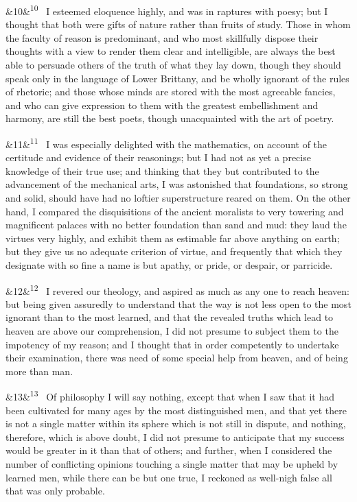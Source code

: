 \documentclass[12pt]{article}
\newcommand{\para}[1][]{\par\noindent\ifx&#1&\else\textsuperscript{\footnotesize #1}~\fi}
\begin{document}
\para[10] I esteemed eloquence highly, and was in raptures with poesy; but I thought that both were gifts of nature rather than fruits of study. Those in whom the faculty of reason is predominant, and who most skillfully dispose their thoughts with a view to render them clear and intelligible, are always the best able to persuade others of the truth of what they lay down, though they should speak only in the language of Lower Brittany, and be wholly ignorant of the rules of rhetoric; and those whose minds are stored with the most agreeable fancies, and who can give expression to them with the greatest embellishment and harmony, are still the best poets, though unacquainted with the art of poetry.

\para[11] I was especially delighted with the mathematics, on account of the certitude and evidence of their reasonings; but I had not as yet a precise knowledge of their true use; and thinking that they but contributed to the advancement of the mechanical arts, I was astonished that foundations, so strong and solid, should have had no loftier superstructure reared on them. On the other hand, I compared the disquisitions of the ancient moralists to very towering and magnificent palaces with no better foundation than sand and mud: they laud the virtues very highly, and exhibit them as estimable far above anything on earth; but they give us no adequate criterion of virtue, and frequently that which they designate with so fine a name is but apathy, or pride, or despair, or parricide.

\para[12] I revered our theology, and aspired as much as any one to reach heaven: but being given assuredly to understand that the way is not less open to the most ignorant than to the most learned, and that the revealed truths which lead to heaven are above our comprehension, I did not presume to subject them to the impotency of my reason; and I thought that in order competently to undertake their examination, there was need of some special help from heaven, and of being more than man.

\para[13] Of philosophy I will say nothing, except that when I saw that it had been cultivated for many ages by the most distinguished men, and that yet there is not a single matter within its sphere which is not still in dispute, and nothing, therefore, which is above doubt, I did not presume to anticipate that my success would be greater in it than that of others; and further, when I considered the number of conflicting opinions touching a single matter that may be upheld by learned men, while there can be but one true, I reckoned as well-nigh false all that was only probable.
\end{document}
